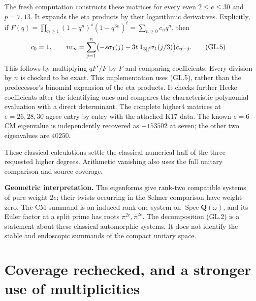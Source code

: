 \documentclass[11pt,a4paper]{article}
\theoremstyle{definition}
\renewcommand{\paragraph}[1]{\par\smallskip\noindent\textbf{#1}\quad\ignorespaces}
\begin{document}
The fresh computation 
constructs these matrices for every even $2\leq e\leq30$
and $p=7,13$. It expands the eta products by their logarithmic
derivatives. Explicitly, if
$F(q)=\prod_{n\geq1}(1-q^n)^s(1-q^{3n})^t
=\sum_{n\geq0}c_nq^n$, then
\[
 c_0=1,\qquad
 n c_n=\sum_{j=1}^n
   \bigl(-s\sigma_1(j)-3t\,{\bf1}_{3\mid j}\sigma_1(j/3)\bigr)c_{n-j}.
 \tag{GL.5}
\]
This follows by multiplying $qF'/F$ by $F$ and comparing
coefficients. Every division by $n$ is checked to be exact.
This implementation uses (GL.5), rather than the predecessor's
binomial expansion of the eta products.
It checks further Hecke coefficients after the identifying
ones and compares the characteristic-polynomial evaluation
with a direct determinant. The complete higher4 matrices at
$e=26,28,30$ agree entry by entry with the attached K17 data.
The known $e=6$ CM eigenvalue is independently recovered as
$-153502$ at seven; the other two eigenvalues are $40250$.

These classical calculations settle the classical numerical half
of the three requested higher degrees. Arithmetic vanishing
also uses the full unitary comparison and source coverage.

\paragraph{Geometric interpretation.}
The eigenforms give rank-two compatible systems of pure weight
$2e$; their twists occurring in the Selmer comparison have
weight zero. The CM summand is an induced rank-one system on
$\operatorname{Spec}\mathbf Q(\omega)$, and its Euler factor
at a split prime has roots $\pi^{2e},\bar\pi^{2e}$.
The decomposition (GL.2) is a statement about these classical
automorphic systems. It does not identify the stable and
endoscopic summands of the compact unitary space.



\section{Coverage rechecked, and a stronger use of multiplicities}
\label{sec:kt-coverage}
\end{document}
